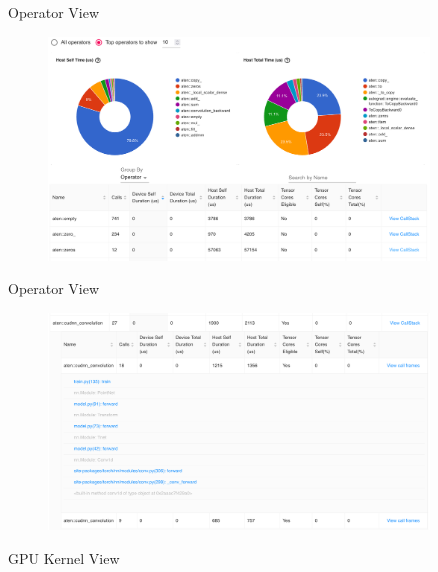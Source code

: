 \documentclass[compress,aspectratio=169]{beamer}
\begin{document}
\begin{frame}{Operator View}
    \vspace{-1em}
\begin{center}
    \begin{figure}
        \includegraphics[width=0.9\textwidth]{../../data/scap_gtx1080_profiler-torch_batch-size-64_14650758_operator-view}
    \end{figure}
    \end{center}
\end{frame}

\begin{frame}{Operator View}
    \vspace{-1em}
\begin{center}
    \begin{figure}
        \includegraphics[width=0.9\textwidth]{../../data/scap_gtx1080_profiler-torch_batch-size-64_14650758_operator-view-details}
    \end{figure}
    \end{center}
\end{frame}

\begin{frame}
\begin{center}
GPU Kernel View
\end{center}
\end{frame}
\end{document}
